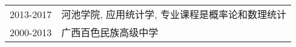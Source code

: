 \begin{tabular}{ll}
  2013-2017 & 河池学院, 应用统计学, 专业课程是概率论和数理统计 \\
  2000-2013 & 广西百色民族高级中学 \\
\end{tabular}

